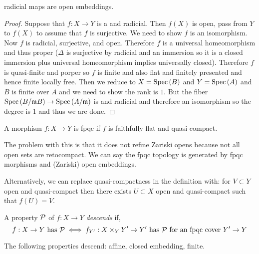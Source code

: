 \documentclass[12pt]{article}
\begin{document}
\begin{thm}
\etale radicial maps are open embeddings.
\end{thm}

\begin{proof}
Suppose that $f : X \to Y$ is a \etale and radicial. Then $f(X)$ is open, pass from $Y$ to $f(X)$ to assume that $f$ is surjective. We need to show $f$ is an isomorphism. Now $f$ is radicial, surjective, and open. Therefore $f$ is a universal homeomorphism and thus proper ($\Delta$ is surjective by radicial and an immersion so it is a closed immersion plus universal homeomorphism implies universally closed). Therefore $f$ is quasi-finite and porper so $f$ is finite and also flat and finitely presented and hence finite locally free. Then we reduce to $X = \mathrm{Spec}\left( B \right)$ and $Y = \mathrm{Spec}\left( A \right)$ and $B$ is finite over $A$ and we need to show the rank is $1$. But the fiber $\mathrm{Spec}\left( B / \mathfrak{m} B \right) \to \mathrm{Spec}\left( A / \mathfrak{m} \right)$ is \etale and radicial and therefore an isomorphism so the degree is $1$ and thus we are done. 
\end{proof}

\begin{defn}
A morphism $f : X \to Y$ is fpqc if $f$ is faithfully flat and quasi-compact. 
\end{defn}

\begin{rmk}
The problem with this is that it does not refine Zariski opens because not all open sets are retocompact. We can say the fpqc topology is generated by fpqc morphisms and (Zariski) open embeddings.
\end{rmk}

\begin{rmk}
Alternatively, we can replace quasi-compactness in the definition with: for $V \subset Y$ open and quasi-compact then there exists $U \subset X$ open and quasi-compact such that $f(U) = V$. 
\end{rmk}

\begin{defn}
A property $\mathcal{P}$ of $f : X \to Y$ \textit{descends} if,
\[ f : X \to Y \text{ has } \mathcal{P} \iff f_{Y'} : X \times_Y Y' \to Y' \text{ has } \mathcal{P} \text{ for an fpqc cover } Y' \to Y \]
\end{defn}

\begin{prop}
The following properties descend: affine, closed embedding, finite.
\end{prop}
\end{document}
